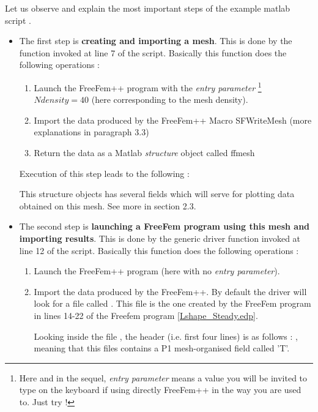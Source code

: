 Let us observe and explain the most important steps of the example matlab script . 

\begin{itemize}
\item  The first step is {\bf creating and importing a mesh}. This is done by the function  invoked at line 7 of the script. 
Basically this function does the following operations :
\begin{enumerate}
\item Launch the FreeFem++ program  with the {\em entry parameter} \footnote{Here and in the sequel, 
{\em entry parameter} means a value you will be invited to type on the keyboard if using directly FreeFem++ in the way you are used to. Just try !}
$Ndensity = 40$ (here corresponding to the mesh density).
\item Import the data produced by the FreeFem++ Macro {\sf SFWriteMesh} (more explanations in paragraph 3.3) 
\item Return the data as a Matlab {\em structure} object called {\sf ffmesh}
\end{enumerate}

Execution of this step leads to the following :


This structure objects has several fields which will serve for plotting data obtained on this mesh. See more in section 2.3.

\item The second step is {\bf launching a FreeFem program using this mesh and importing results}. 
This is done by the generic driver function  invoked at line 12 of the script. 
Basically this function does the following operations :
\begin{enumerate}
\item Launch the FreeFem++ program   (here with no {\em entry parameter}).
\item Import the data produced by the FreeFem++. By default the driver will look for a file called . 
This file is the one created by the FreeFem program in lines 14-22 of the Freefem program \ref{Lshape_Steady.edp}.

Looking inside the file , the header (i.e.  first four lines) is as follows :
, 
meaning that this files contains a P1 mesh-organised field called 'T'.


\end{enumerate}
\end{itemize}
